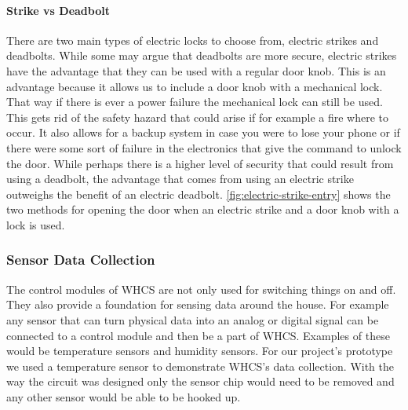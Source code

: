 \paragraph{Strike vs Deadbolt}
\label{sec:strike-v-deadbolt}
There are two main types of electric locks to choose from, electric strikes and
deadbolts. While some may argue that deadbolts are more secure, electric
strikes have the advantage that they can be used with a regular door knob.
This is an advantage because it allows us to include a door knob with a
mechanical lock. That way if there is ever a power failure the mechanical lock
can still be used. This gets rid of the safety hazard that could arise if for
example a fire where to occur. It also allows for a backup system in case you
were to lose your phone or if there were some sort of failure in the
electronics that give the command to unlock the door. While perhaps there is a
higher level of security that could result from using a deadbolt, the advantage
that comes from using an electric strike outweighs the benefit of an electric
deadbolt. \autoref{fig:electric-strike-entry} shows the two methods for opening the door when
an electric strike and a door knob with a lock is used.


\subsubsection{Sensor Data Collection}
The control modules of WHCS are not only used for switching things on and
off. They also provide a foundation for sensing data around the house. For
example any sensor that can turn physical data into an analog or digital signal
can be connected to a control module and then be a part of WHCS. Examples of
these would be temperature sensors and humidity sensors. For our project's prototype we used a temperature sensor to demonstrate WHCS's data
collection. With the way the circuit was designed only the sensor chip
would need to be removed and any other sensor would be able to be hooked up.

